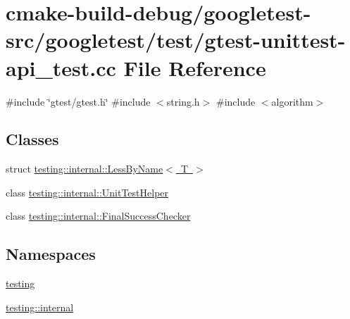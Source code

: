 \hypertarget{gtest-unittest-api__test_8cc}{}\section{cmake-\/build-\/debug/googletest-\/src/googletest/test/gtest-\/unittest-\/api\+\_\+test.cc File Reference}
\label{gtest-unittest-api__test_8cc}
{\ttfamily \#include \char`\"{}gtest/gtest.\+h\char`\"{}}\newline
{\ttfamily \#include $<$string.\+h$>$}\newline
{\ttfamily \#include $<$algorithm$>$}\newline
\subsection*{Classes}
\begin{DoxyCompactItemize}
\item 
struct \mbox{\hyperlink{structtesting_1_1internal_1_1LessByName}{testing\+::internal\+::\+Less\+By\+Name$<$ T $>$}}
\item 
class \mbox{\hyperlink{classtesting_1_1internal_1_1UnitTestHelper}{testing\+::internal\+::\+Unit\+Test\+Helper}}
\item 
class \mbox{\hyperlink{classtesting_1_1internal_1_1FinalSuccessChecker}{testing\+::internal\+::\+Final\+Success\+Checker}}
\end{DoxyCompactItemize}
\subsection*{Namespaces}
\begin{DoxyCompactItemize}
\item 
 \mbox{\hyperlink{namespacetesting}{testing}}
\item 
 \mbox{\hyperlink{namespacetesting_1_1internal}{testing\+::internal}}
\end{DoxyCompactItemize}
